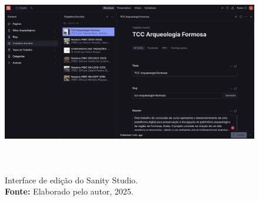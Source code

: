 \begin{enumerate}
\begin{enumerate}
                    \begin{figure}[H]
                        \centering
                        \includegraphics[height=9cm, keepaspectratio]{img/sanity/sanity admin.png}
                        \caption{ Interface de edição do Sanity Studio. \\
                            \textbf{Fonte:} Elaborado pelo autor, 2025.}
                        \label{fig:sanity_admin}
                    \end{figure}
                    

\end{enumerate}
\end{enumerate}
